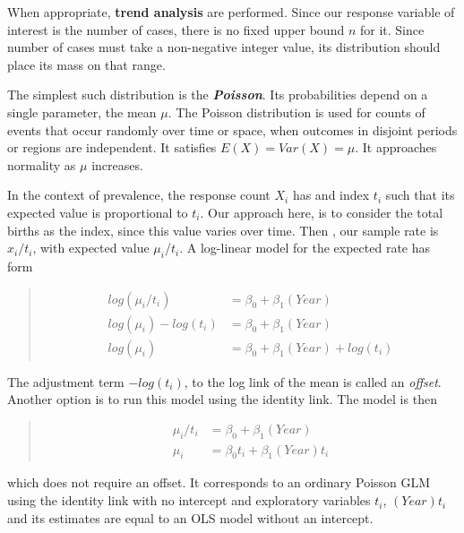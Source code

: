 \documentclass[
]{krantz}
\begin{document}
When appropriate, \textbf{trend analysis} are performed. Since our response variable of interest is the number of cases, there is no fixed upper bound \(n\) for it. Since number of cases must take a non-negative integer value, its distribution should place its mass on that range.

The simplest such distribution is the \textbf{\emph{Poisson}}. Its probabilities depend on a single parameter, the mean \(\mu\). The Poisson distribution is used for counts of events that occur randomly over time or space, when outcomes in disjoint periods or regions are independent. It satisfies \(E\left(X\right)=Var\left(X\right)=\mu\). It approaches normality as \(\mu\) increases.

In the context of prevalence, the response count \(X_{i}\) has and index \(t_{i}\) such that its expected value is proportional to \(t_{i}\). Our approach here, is to consider the total births as the index, since this value varies over time. Then , our sample rate is \(x_{i}/t_{i}\), with expected value \(\mu_{i}/t_{i}\). A log-linear model for the expected rate has form

\begin{quote}
\[
\begin{aligned}
log\left(\mu_{i}/t_{i}\right) &= \beta_{0} + \beta_{1}(Year)  \\
log\left(\mu_{i}\right) - log\left(t_{i}\right) &= \beta_{0} + \beta_{1}(Year)  \\
log\left(\mu_{i}\right) &= \beta_{0} + \beta_{1}(Year) + log\left(t_{i}\right)
\end{aligned}
\]
\end{quote}

The adjustment term \(-log\left(t_{i}\right)\), to the log link of the mean is called an \emph{offset}. Another option is to run this model using the identity link. The model is then

\begin{quote}
\[
\begin{aligned}
\mu_{i}/t_{i} &= \beta_{0} + \beta_{1}(Year)  \\
\mu_{i} &= \beta_{0}t_{i} + \beta_{1}(Year)t_{i}
\end{aligned}
\]
\end{quote}

which does not require an offset. It corresponds to an ordinary Poisson GLM using the identity link with no intercept and exploratory variables \(t_{i}\), \((Year)t_{i}\) and its estimates are equal to an OLS model without an intercept.
\end{document}
